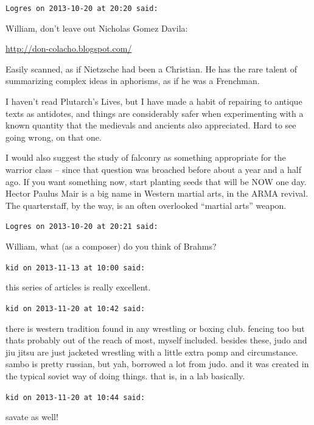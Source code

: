 \begin{footnotesize}
\begin{sffamily}
\hfill

\texttt{Logres on 2013-10-20 at 20:20 said:}

William, don't leave out Nicholas Gomez Davila:

\url{http://don-colacho.blogspot.com/}

Easily scanned, as if Nietzsche had been a Christian. He has the rare talent of summarizing complex ideas in aphorisms, as if he was a Frenchman.

I haven't read Plutarch's Lives, but I have made a habit of repairing to antique texts as antidotes, and things are considerably safer when experimenting with a known quantity that the medievals and ancients also appreciated. Hard to see going wrong, on that one.

I would also suggest the study of falconry as something appropriate for the warrior class -- since that question was broached before about a year and a half ago. If you want something now, start planting seeds that will be NOW one day. Hector Paulus Mair is a big name in Western martial arts, in the ARMA revival. The quarterstaff, by the way, is an often overlooked ``martial arts'' weapon.

\hfill

\texttt{Logres on 2013-10-20 at 20:21 said:}

William, what (as a composer) do you think of Brahms?

\hfill

\texttt{kid on 2013-11-13 at 10:00 said:}

this series of articles is really excellent.

\hfill

\texttt{kid on 2013-11-20 at 10:42 said:}

there is western tradition found in any wrestling or boxing club. fencing too but thats probably out of the reach of most, myself included. besides these, judo and jiu jitsu are just jacketed wrestling with a little extra pomp and circumstance. sambo is pretty russian, but yah, borrowed a lot from judo. and it was created in the typical soviet way of doing things. that is, in a lab basically.

\hfill

\texttt{kid on 2013-11-20 at 10:44 said:}

savate as well!


\hfill

\end{sffamily}
\end{footnotesize}


